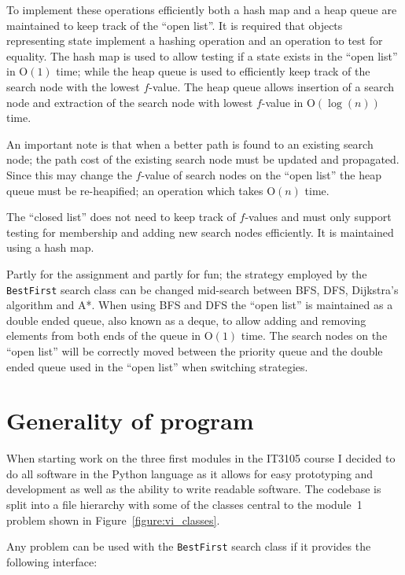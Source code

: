 To implement these operations efficiently both a hash map and a heap queue are maintained to keep track of the ``open list''. It is required that objects representing state implement a hashing operation and an operation to test for equality. The hash map is used to allow testing if a state exists in the ``open list'' in O$(1)$ time; while the heap queue is used to efficiently keep track of the search node with the lowest $f$-value. The heap queue allows insertion of a search node and extraction of the search node with lowest $f$-value in O$(\log(n))$ time.

An important note is that when a better path is found to an existing search node; the path cost of the existing search node must be updated and propagated. Since this may change the $f$-value of search nodes on the ``open list'' the heap queue must be re-heapified; an operation which takes O$(n)$ time.

The ``closed list'' does not need to keep track of $f$-values and must only support testing for membership and adding new search nodes efficiently. It is maintained using a hash map.

Partly for the assignment and partly for fun; the strategy employed by the \texttt{BestFirst} search class can be changed mid-search between \ac{BFS}, \ac{DFS}, Dijkstra's algorithm and A*. When using \ac{BFS} and \ac{DFS} the ``open list'' is maintained as a double ended queue, also known as a deque, to allow adding and removing elements from both ends of the queue in O$(1)$ time. The search nodes on the ``open list'' will be correctly moved between the priority queue and the double ended queue used in the ``open list'' when switching strategies.

\section*{Generality of program}

When starting work on the three first modules in the \textsc{IT3105} course I decided to do all software in the Python language as it allows for easy prototyping and development as well as the ability to write readable software. The codebase is split into a file hierarchy with some of the classes central to the module~1 problem shown in Figure~\ref{figure:vi_classes}.

Any problem can be used with the \texttt{BestFirst} search class if it provides the following interface:

